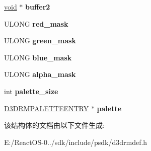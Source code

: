 \begin{DoxyCompactItemize}
\hyperlink{interfacevoid}{void} $\ast$ {\bfseries buffer2}
\item 
\mbox{\label{struct___d3_d_r_m_i_m_a_g_e_a3ed0cb89aab5b44c3457de840d93fab7}} 
U\+L\+O\+NG {\bfseries red\+\_\+mask}
\item 
\mbox{\label{struct___d3_d_r_m_i_m_a_g_e_aed1bf4ae7a9ed8c0fd2621e02a392ff6}} 
U\+L\+O\+NG {\bfseries green\+\_\+mask}
\item 
\mbox{\label{struct___d3_d_r_m_i_m_a_g_e_a1027d8e05980b3ee73fb0e7e8bb5b038}} 
U\+L\+O\+NG {\bfseries blue\+\_\+mask}
\item 
\mbox{\label{struct___d3_d_r_m_i_m_a_g_e_aae45bd99d85cb0579633e77af8d59990}} 
U\+L\+O\+NG {\bfseries alpha\+\_\+mask}
\item 
\mbox{\label{struct___d3_d_r_m_i_m_a_g_e_ab7aa8e1f5022cd04299fcdff9f30c09f}} 
int {\bfseries palette\+\_\+size}
\item 
\mbox{\label{struct___d3_d_r_m_i_m_a_g_e_a6e07074063f46eeb633b42f78a692656}} 
\hyperlink{struct___d3_d_r_m_p_a_l_e_t_t_e_e_n_t_r_y}{D3\+D\+R\+M\+P\+A\+L\+E\+T\+T\+E\+E\+N\+T\+RY} $\ast$ {\bfseries palette}
\end{DoxyCompactItemize}


该结构体的文档由以下文件生成\+:\begin{DoxyCompactItemize}
\item 
E\+:/\+React\+O\+S-\/0../sdk/include/psdk/d3drmdef.\+h\end{DoxyCompactItemize}
